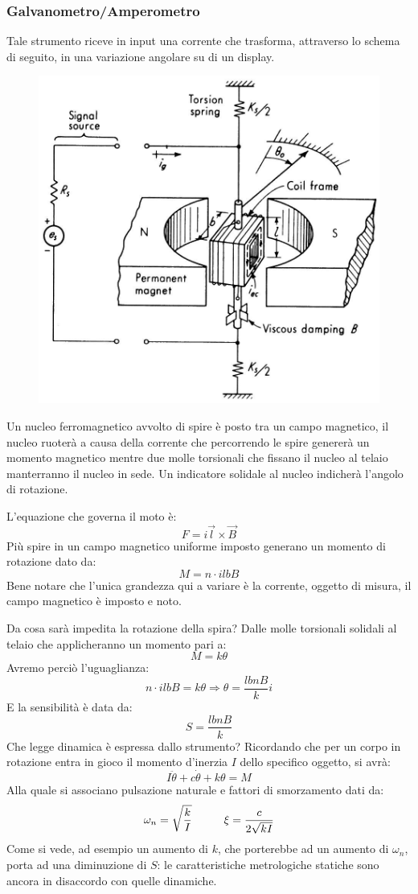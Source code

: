 \documentclass[a4paper, 15pt]{article}
\begin{document}
\subsubsection{Galvanometro/Amperometro} 	
\begin{adjustwidth}{2in}{}
		Tale strumento riceve in input una corrente che trasforma, attraverso lo schema di seguito, in una variazione angolare su di un display. 		
\begin{figure}[H]
	\centering
	\includegraphics[width=0.3\linewidth]{fig/imag8}
	\label{fig:imag8}
\end{figure}
		Un nucleo ferromagnetico avvolto di spire è posto tra un campo magnetico, il nucleo ruoterà a causa della corrente che percorrendo le spire genererà un momento magnetico mentre due molle torsionali che fissano il nucleo al telaio manterranno il nucleo in sede. Un indicatore solidale al nucleo indicherà l'angolo di rotazione. \newline 
		
		L'equazione che governa il moto è:
		\[F = i\vec{l}\times \vec{B}\]
		Più spire in un campo magnetico uniforme imposto generano un momento di rotazione dato da:
		\[ M = n\cdot ilbB\]
		Bene notare che l'unica grandezza qui a variare è la corrente, oggetto di misura, il campo magnetico è imposto e noto. \newline 
		
		Da cosa sarà impedita la rotazione della spira? Dalle molle torsionali solidali al telaio che applicheranno un momento pari a: 
		\[M=k\theta\]
		Avremo perciò l'uguaglianza: 
		\[ n\cdot ilbB = k\theta \Rightarrow \theta = \dfrac{lbnB}{k}i\]
		E la sensibilità è data da:
		\[ S = \dfrac{lbnB}{k} \]
		Che legge dinamica è espressa dallo strumento? Ricordando che per un corpo in rotazione entra in gioco il momento d'inerzia $I$ dello specifico oggetto, si avrà:
		\[I\ddot{\theta} + c\dot{\theta} + k\theta = M\]
		Alla quale si associano pulsazione naturale e fattori di smorzamento dati da: 
		\[ \omega_n = \sqrt{k\over I} \hspace{1cm} \xi = \dfrac{c}{2\sqrt{kI}}\]
		Come si vede, ad esempio un aumento di $k$, che porterebbe ad un aumento di $\omega_n$, porta ad una diminuzione di $S$: le caratteristiche metrologiche statiche sono ancora in disaccordo con quelle dinamiche. 


\end{adjustwidth}
\end{document}
